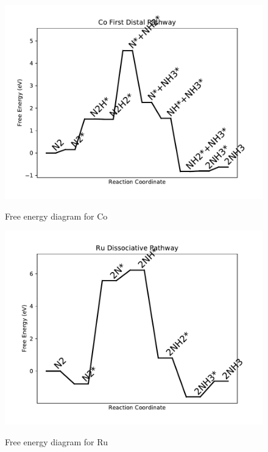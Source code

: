 \documentclass{article}
\begin{document}
\begin{figure}
\includegraphics[width=1\linewidth]{data/plots/Co_distal_1.pdf}
\label{fig:Co_distal_1}
\caption{Free energy diagram for Co}
\end{figure}

\clearpage
\begin{figure}
\includegraphics[width=1\linewidth]{data/plots/Ru_dissociative.pdf}
\label{fig:Ru_dissociative}
\caption{Free energy diagram for Ru}
\end{figure}
\end{document}
